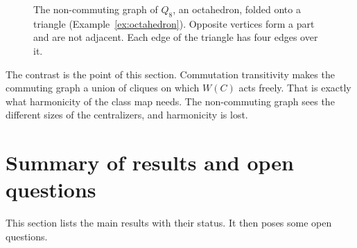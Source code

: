 \documentclass[12pt,letterpaper]{article}
\numberwithin{equation}{section}
\theoremstyle{plain}
\theoremstyle{definition}
\begin{document}
\begin{figure}[ht]
\centering
{}
\caption{The non-commuting graph of $Q_8$, an octahedron, folded onto a
triangle (Example~\ref{ex:octahedron}). Opposite vertices form a part and are
not adjacent. Each edge of the triangle has four edges over it.}
\label{fig:octa}
\end{figure}

The contrast is the point of this section. Commutation transitivity makes
the commuting graph a union of cliques on which $W(C)$ acts freely. That is
exactly what harmonicity of the class map needs. The non-commuting graph
sees the different sizes of the centralizers, and harmonicity is lost.

\section{Summary of results and open questions}\label{sec:summary}

This section lists the main results with their status. It then poses
some open questions.
\end{document}
